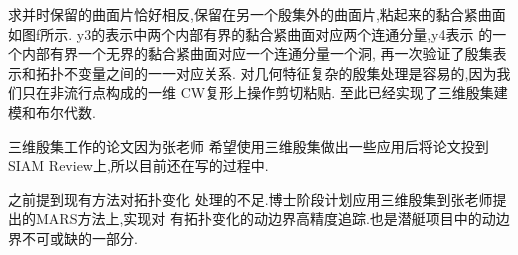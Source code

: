 \documentclass[UTF8]{ctexbeamer}	%
\theoremstyle{plain}
\theoremstyle{definition}
\theoremstyle{remark}
\numberwithin{equation}{section}
\begin{document}
\begin{frame}
  求并时保留的曲面片恰好相反,保留在另一个殷集外的曲面片,粘起来的黏合紧曲面如图f所示.
  y3的表示中两个内部有界的黏合紧曲面对应两个连通分量,y4表示
  的一个内部有界一个无界的黏合紧曲面对应一个连通分量一个洞,
  再一次验证了殷集表示和拓扑不变量之间的一一对应关系.
  对几何特征复杂的殷集处理是容易的,因为我们只在非流行点构成的一维
  CW复形上操作剪切粘贴.
  至此已经实现了三维殷集建模和布尔代数.
\end{frame}

\begin{frame}
  三维殷集工作的论文因为张老师
  希望使用三维殷集做出一些应用后将论文投到SIAM Review上,所以目前还在写的过程中.
\end{frame}

\begin{frame}
  之前提到现有方法对拓扑变化
  处理的不足.博士阶段计划应用三维殷集到张老师提出的MARS方法上,实现对
  有拓扑变化的动边界高精度追踪.也是潜艇项目中的动边界不可或缺的一部分.
\end{frame}

\end{document}
